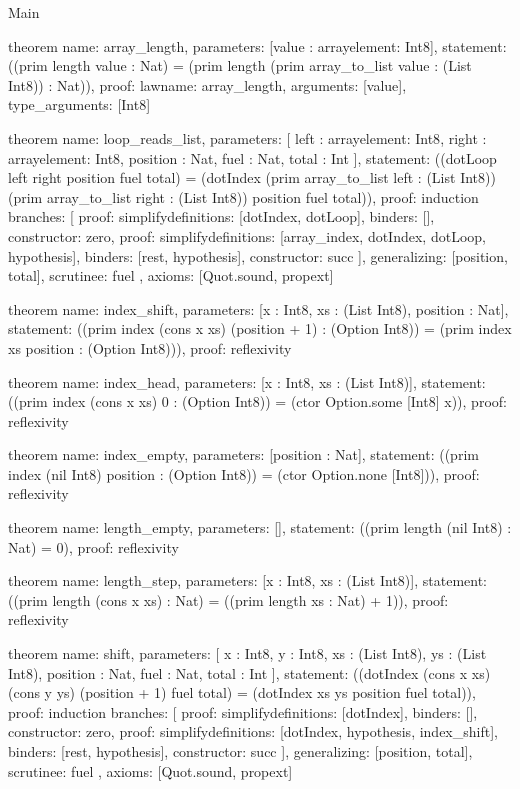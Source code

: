 \begin{lexlean}{Main}
\begin{semanticmodule}
theorem{
  name: array_length,
  parameters: [value : array{element: Int8}],
  statement: ((prim length value : Nat) = (prim length (prim array_to_list value : (List Int8)) : Nat)),
  proof: law{name: array_length, arguments: [value], type_arguments: [Int8]}
}

theorem{
  name: loop_reads_list,
  parameters: [
    left : array{element: Int8},
    right : array{element: Int8},
    position : Nat,
    fuel : Nat,
    total : Int
  ],
  statement: ((dotLoop left right position fuel total) = (dotIndex (prim array_to_list left : (List Int8)) (prim array_to_list right : (List Int8)) position fuel total)),
  proof: induction{
    branches: [
      {proof: simplify{definitions: [dotIndex, dotLoop]}, binders: [], constructor: zero},
      {
        proof: simplify{definitions: [array_index, dotIndex, dotLoop, hypothesis]},
        binders: [rest, hypothesis],
        constructor: succ
      }
    ],
    generalizing: [position, total],
    scrutinee: fuel
  },
  axioms: [Quot.sound, propext]
}

theorem{
  name: index_shift,
  parameters: [x : Int8, xs : (List Int8), position : Nat],
  statement: ((prim index (cons x xs) (position + 1) : (Option Int8)) = (prim index xs position : (Option Int8))),
  proof: reflexivity{}
}

theorem{
  name: index_head,
  parameters: [x : Int8, xs : (List Int8)],
  statement: ((prim index (cons x xs) 0 : (Option Int8)) = (ctor Option.some [Int8] x)),
  proof: reflexivity{}
}

theorem{
  name: index_empty,
  parameters: [position : Nat],
  statement: ((prim index (nil Int8) position : (Option Int8)) = (ctor Option.none [Int8])),
  proof: reflexivity{}
}

theorem{
  name: length_empty,
  parameters: [],
  statement: ((prim length (nil Int8) : Nat) = 0),
  proof: reflexivity{}
}

theorem{
  name: length_step,
  parameters: [x : Int8, xs : (List Int8)],
  statement: ((prim length (cons x xs) : Nat) = ((prim length xs : Nat) + 1)),
  proof: reflexivity{}
}

theorem{
  name: shift,
  parameters: [
    x : Int8,
    y : Int8,
    xs : (List Int8),
    ys : (List Int8),
    position : Nat,
    fuel : Nat,
    total : Int
  ],
  statement: ((dotIndex (cons x xs) (cons y ys) (position + 1) fuel total) = (dotIndex xs ys position fuel total)),
  proof: induction{
    branches: [
      {proof: simplify{definitions: [dotIndex]}, binders: [], constructor: zero},
      {
        proof: simplify{definitions: [dotIndex, hypothesis, index_shift]},
        binders: [rest, hypothesis],
        constructor: succ
      }
    ],
    generalizing: [position, total],
    scrutinee: fuel
  },
  axioms: [Quot.sound, propext]
}


\end{semanticmodule}
\end{lexlean}
